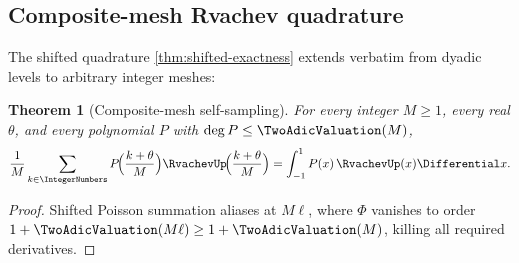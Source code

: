 \documentclass[11pt,oneside]{article}
\numberwithin{equation}{section}
\newtheorem{theorem}{Theorem}[section]
\theoremstyle{definition}
\theoremstyle{remark}
\begin{document}
\subsection{Composite-mesh Rvachev quadrature}

The shifted quadrature \cref{thm:shifted-exactness} extends verbatim
from dyadic levels to arbitrary integer meshes:

\begin{theorem}[Composite-mesh self-sampling]
\label{thm:up-composite-mesh}
For every integer $M\ge1$, every real $\theta$, and every polynomial
$P$ with $\deg P\le\TwoAdicValuation(M)$,
\begin{equation}
 \frac1M\sum_{k\in\IntegerNumbers}
 P\!\Bigl(\frac{k+\theta}{M}\Bigr)
 \RvachevUp\!\Bigl(\frac{k+\theta}{M}\Bigr)
 =\int_{-1}^{1}P(x)\,\RvachevUp(x)\Differential x.
 \label{eq:up-composite-mesh}
\end{equation}
\end{theorem}

\begin{proof}
Shifted Poisson summation aliases at $M\ell$, where $\Phi$ vanishes to
order $1+\TwoAdicValuation(M\ell)\ge1+\TwoAdicValuation(M)$, killing all required derivatives.
\end{proof}
\end{document}
